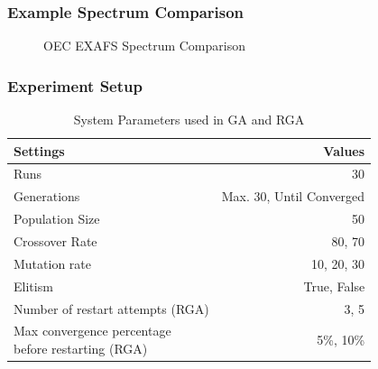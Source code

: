 \documentclass[10pt]{beamer}
\begin{document}
\begin{frame}
	\frametitle{Example Spectrum Comparison}

	\begin{figure}
		\caption{OEC EXAFS Spectrum Comparison}
	\end{figure}

\end{frame}

\begin{frame}
	\frametitle{Experiment Setup}

	\begin{table}
		\begin{tabular}{ | l | r | }
		  \hline
			Settings & Values \\ \hline \hline
			Runs & 30 \\ \hline
			Generations & Max. 30, Until Converged \\ \hline
			Population Size & 50 \\ \hline
			Crossover Rate & 80, 70 \\ \hline
			Mutation rate & 10, 20, 30 \\ \hline
			Elitism & True, False \\ \hline
			Number of restart attempts (RGA) & 3, 5 \\ \hline
			\shortstack{Max convergence percentage \\ before restarting (RGA)} & 5\%, 10\% \\ \hline
		\end{tabular}
		\caption{System Parameters used in GA and RGA}
	\end{table}
\end{frame}
\end{document}
